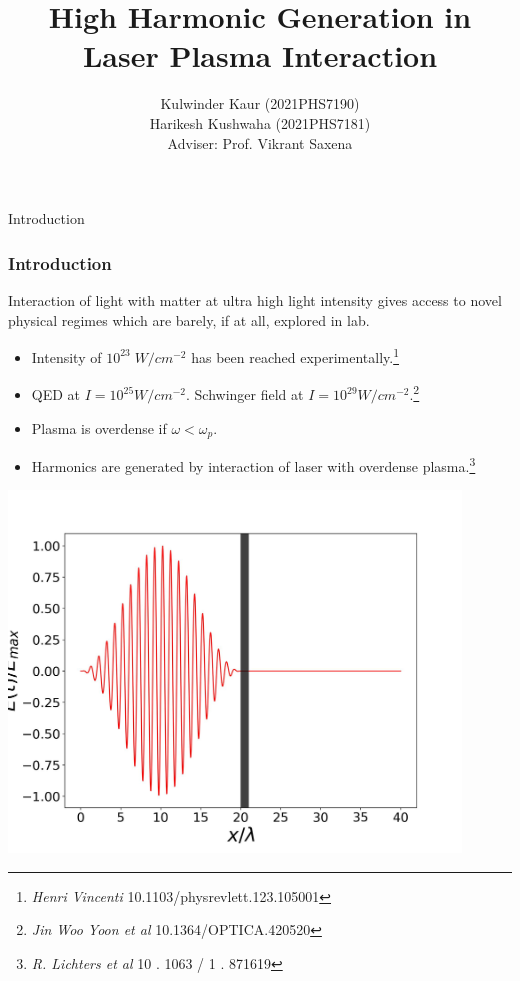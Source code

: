 \documentclass{beamer}
\title[High Harmonic Generation]{High Harmonic Generation in Laser Plasma Interaction}
\date{}
\institute[IIT Delhi]{\large Indian Institute of Technology, Delhi}
\author[]{Kulwinder Kaur (2021PHS7190)\\ Harikesh Kushwaha (2021PHS7181)\\[3mm]Adviser: Prof. Vikrant Saxena}
\begin{document}
\maketitle
\begin{frame}{Introduction}
    \frametitle{Introduction}
    \small
    Interaction of light with matter at ultra high light intensity gives access to novel physical regimes which are barely, if at all, explored in lab.
    \begin{itemize}
        \item Intensity of $10^{23} \; W/cm^{-2}$ has been reached experimentally.\footnote{\textit{Henri Vincenti} 10.1103/physrevlett.123.105001}
        \item QED at $I = 10^{25}W/cm^{-2}$. Schwinger field at $I = 10^{29}W/cm^{-2}$.\footnote{\textit{Jin Woo Yoon et al} 10.1364/OPTICA.420520}
        \item Plasma is overdense if $\omega<\omega_p$.
        \item Harmonics are generated by interaction of laser with overdense plasma.\footnote{\textit{R. Lichters et al} 10 . 1063 / 1 . 871619}
    \end{itemize}
    \begin{minipage}[h]{0.48\linewidth}
        \centering
        \includegraphics[width=0.9\textwidth, height=0.42\textheight]{images/field.jpg}

\end{minipage}
\end{frame}
\end{document}
